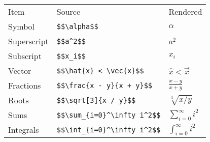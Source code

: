 \begin{tabular}{lll}
Item        & Source                           & Rendered \\
Symbol      & \verb`$$\alpha$$`                & $\alpha$ \\
Superscript & \verb`$$a^2$$`                   & $a^2$ \\
Subscript   & \verb`$$x_i$$`                   & $x_i$ \\
Vector      & \verb`$$\hat{x} < \vec{x}$$`     & $\hat{x} < \vec{x}$ \\
Fractions   & \verb`$$\frac{x - y}{x + y}$$`   & $\frac{x - y}{x + y}$ \\
Roots       & \verb`$$\sqrt[3]{x / y}$$`       & $\sqrt[3]{x / y}$ \\
Sums        & \verb`$$\sum_{i=0}^\infty i^2$$` & $\sum_{i=0}^\infty i^2$ \\
Integrals   & \verb`$$\int_{i=0}^\infty i^2$$` & $\int_{i=0}^\infty i^2$ \\
\end{tabular}
